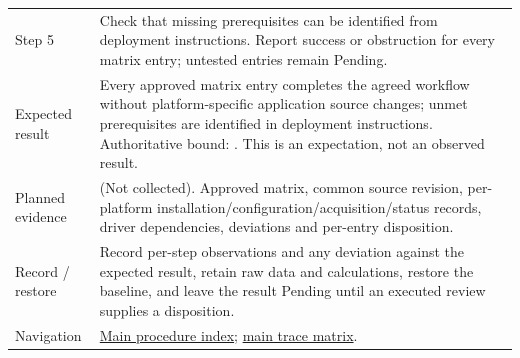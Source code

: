 \begin{tabularx}{\linewidth}{L{3.2cm}Y}
Step 5 & Check that missing prerequisites can be identified from deployment instructions. Report success or obstruction for every matrix entry; untested entries remain Pending.\\
Expected result & Every approved matrix entry completes the agreed workflow without platform-specific application source changes; unmet prerequisites are identified in deployment instructions. Authoritative bound: . This is an expectation, not an observed result.\\
Planned evidence &  (Not collected). Approved matrix, common source revision, per-platform installation/configuration/acquisition/status records, driver dependencies, deviations and per-entry disposition.\\
Record / restore & Record per-step observations and any deviation against the expected result, retain raw data and calculations, restore the baseline, and leave the result Pending until an executed review supplies a disposition.\\
Navigation & \hyperref[Table:WeekTwoTests]{Main procedure index}; \hyperref[Table:TraceabilityMatrix]{main trace matrix}.\\
\end{tabularx}
\normalsize
